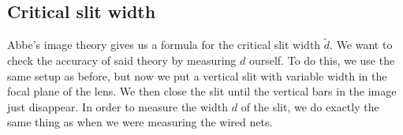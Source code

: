 \subsection{Critical slit width}
\label{chap::slit}
Abbe's image theory gives us a formula for the critical slit width $\tilde{d}$.
We want to check the accuracy of said theory by measuring $d$ ourself.
To do this, we use the same setup as before, but now we put a vertical slit with variable width in the focal plane of the lens. 
We then close the slit until the vertical bars in the image just disappear.
In order to measure the width $d$ of the slit, we do exactly the same thing as when we were measuring the wired nets. 
